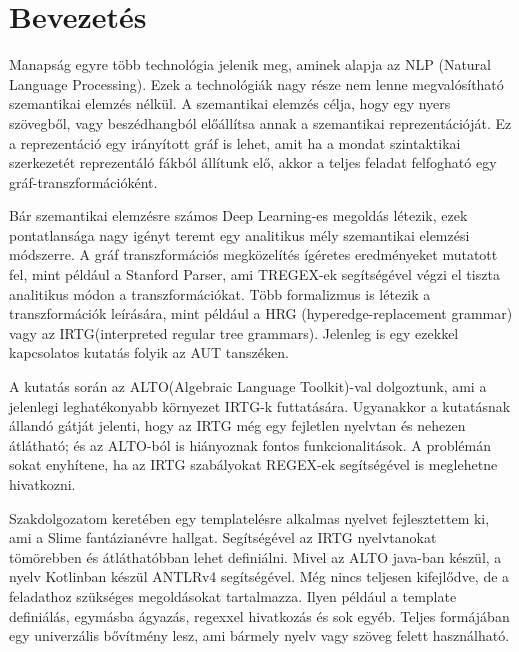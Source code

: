 \chapter{Bevezetés}
\label{sec:introducton}

Manapság egyre több technológia jelenik meg, aminek alapja az NLP (Natural Language Processing). Ezek a technológiák nagy része nem lenne megvalósítható szemantikai elemzés nélkül. A szemantikai elemzés célja, hogy egy nyers szövegből, vagy beszédhangból előállítsa annak a szemantikai reprezentációját. Ez a reprezentáció egy irányított gráf is lehet, amit ha a mondat szintaktikai szerkezetét reprezentáló fákból állítunk elő, akkor a teljes feladat felfogható egy gráf-transzformációként. 

Bár szemantikai elemzésre számos Deep Learning-es megoldás létezik, ezek pontatlansága nagy igényt teremt egy analitikus mély szemantikai elemzési módszerre. A gráf transzformációs megközelítés ígéretes eredményeket mutatott fel, mint például a Stanford Parser, ami TREGEX-ek segítségével végzi el tiszta analitikus módon a transzformációkat.
Több formalizmus is létezik a transzformációk leírására, mint például a HRG (hyperedge-replacement grammar) vagy az IRTG(interpreted regular tree grammars). Jelenleg is egy ezekkel kapcsolatos kutatás folyik az AUT tanszéken.

A kutatás során az ALTO(Algebraic Language Toolkit)-val dolgoztunk, ami a jelenlegi leghatékonyabb környezet IRTG-k futtatására. Ugyanakkor a kutatásnak állandó gátját jelenti, hogy az IRTG még egy fejletlen nyelvtan és nehezen átlátható; és az ALTO-ból is hiányoznak fontos funkcionalitások. A problémán sokat enyhítene, ha az IRTG szabályokat REGEX-ek segítségével is meglehetne hivatkozni.

Szakdolgozatom keretében egy templatelésre alkalmas nyelvet fejlesztettem ki, ami a Slime fantázianévre hallgat. Segítségével az IRTG nyelvtanokat tömörebben és átláthatóbban lehet definiálni. Mivel az ALTO java-ban készül, a nyelv Kotlinban készül ANTLRv4 segítségével. Még nincs teljesen kifejlődve, de a feladathoz szükséges megoldásokat tartalmazza. Ilyen például a template definiálás, egymásba ágyazás, regexxel hivatkozás és sok egyéb. Teljes formájában egy univerzális bővítmény lesz, ami bármely nyelv vagy szöveg felett használható.
 	 	 	
